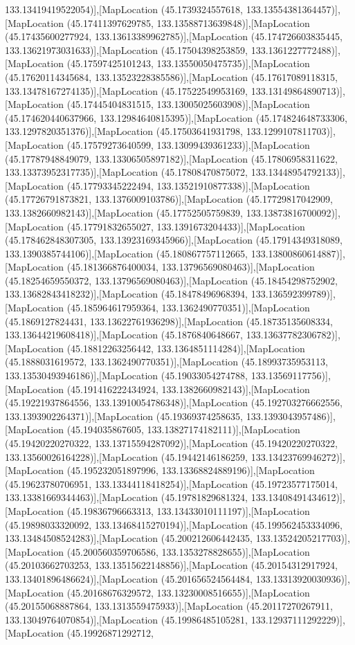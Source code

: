 133.13419419522054)],[MapLocation (45.1739324557618, 133.13554381364457)],[MapLocation (45.17411397629785, 133.13588713639848)],[MapLocation (45.17435600277924, 133.13613389962785)],[MapLocation (45.174726603835445, 133.13621973031633)],[MapLocation (45.17504398253859, 133.1361227772488)],[MapLocation (45.17597425101243, 133.13550050475735)],[MapLocation (45.17620114345684, 133.13523228385586)],[MapLocation (45.17617089118315, 133.13478167274135)],[MapLocation (45.17522549953169, 133.13149864890713)],[MapLocation (45.17445404831515, 133.13005025603908)],[MapLocation (45.174620440637966, 133.12984640815395)],[MapLocation (45.174824648733306, 133.1297820351376)],[MapLocation (45.17503641931798, 133.1299107811703)],[MapLocation (45.17579273640599, 133.13099439361233)],[MapLocation (45.17787948849079, 133.13306505897182)],[MapLocation (45.17806958311622, 133.13373952317735)],[MapLocation (45.17808470875072, 133.13448954792133)],[MapLocation (45.17793345222494, 133.13521910877338)],[MapLocation (45.17726791873821, 133.1376009103786)],[MapLocation (45.17729817042909, 133.1382660982143)],[MapLocation (45.17752505759839, 133.13873816700092)],[MapLocation (45.17791832655027, 133.1391673204433)],[MapLocation (45.178462848307305, 133.13923169345966)],[MapLocation (45.17914349318089, 133.1390385744106)],[MapLocation (45.180867757112665, 133.13800860614887)],[MapLocation (45.181366876400034, 133.13796569080463)],[MapLocation (45.18254659550372, 133.13796569080463)],[MapLocation (45.18454298752902, 133.13682843418232)],[MapLocation (45.18478496968394, 133.136592399789)],[MapLocation (45.185964617959364, 133.1362490770351)],[MapLocation (45.1869127824431, 133.13622761936298)],[MapLocation (45.18735135608334, 133.13644219608418)],[MapLocation (45.1876840648667, 133.13637782306782)],[MapLocation (45.18812263256442, 133.1364851114284)],[MapLocation (45.1888031619572, 133.1362490770351)],[MapLocation (45.18993735953113, 133.13530493946186)],[MapLocation (45.19033054274788, 133.13569117756)],[MapLocation (45.191416222434924, 133.1382660982143)],[MapLocation (45.19221937864556, 133.13910054786348)],[MapLocation (45.192703276662556, 133.1393902264371)],[MapLocation (45.19369374258635, 133.1393043957486)],[MapLocation (45.194035867605, 133.13827174182111)],[MapLocation (45.19420220270322, 133.13715594287092)],[MapLocation (45.19420220270322, 133.13560026164228)],[MapLocation (45.19442146186259, 133.13423769946272)],[MapLocation (45.195232051897996, 133.13368824889196)],[MapLocation (45.19623780706951, 133.13344118418254)],[MapLocation (45.19723577175014, 133.13381669344463)],[MapLocation (45.19781829681324, 133.13408491434612)],[MapLocation (45.19836796663313, 133.13433010111197)],[MapLocation (45.19898033320092, 133.13468415270194)],[MapLocation (45.199562453334096, 133.13484508524283)],[MapLocation (45.200212606442435, 133.13524205217703)],[MapLocation (45.200560359706586, 133.1353278828655)],[MapLocation (45.20103662703253, 133.13515622148856)],[MapLocation (45.20154312917924, 133.13401896486624)],[MapLocation (45.201656524564484, 133.13313920030936)],[MapLocation (45.20168676329572, 133.13230008516655)],[MapLocation (45.20155068887864, 133.1313559475933)],[MapLocation (45.20117270267911, 133.13049764070854)],[MapLocation (45.19986485105281, 133.12937111292229)],[MapLocation (45.19926871292712, 